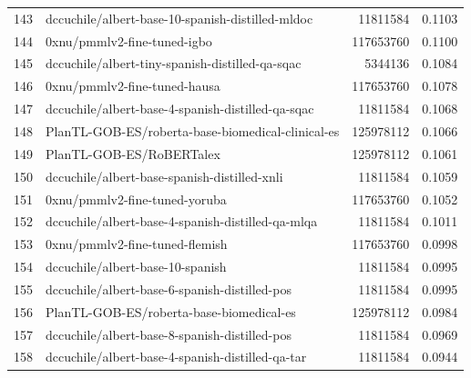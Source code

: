 {\begin{xltabular}{\textwidth}{l X rc}
    143              & dccuchile/albert-base-10-spanish-distilled-mldoc                           & 11811584      & 0.1103       \\
    144              & 0xnu/pmmlv2-fine-tuned-igbo                                                & 117653760     & 0.1100       \\
    145              & dccuchile/albert-tiny-spanish-distilled-qa-sqac                            & 5344136       & 0.1084       \\
    146              & 0xnu/pmmlv2-fine-tuned-hausa                                               & 117653760     & 0.1078       \\
    147              & dccuchile/albert-base-4-spanish-distilled-qa-sqac                          & 11811584      & 0.1068       \\
    148              & PlanTL-GOB-ES/roberta-base-biomedical-clinical-es                          & 125978112     & 0.1066       \\
    149              & PlanTL-GOB-ES/RoBERTalex                                                   & 125978112     & 0.1061       \\
    150              & dccuchile/albert-base-spanish-distilled-xnli                               & 11811584      & 0.1059       \\
    151              & 0xnu/pmmlv2-fine-tuned-yoruba                                              & 117653760     & 0.1052       \\
    152              & dccuchile/albert-base-4-spanish-distilled-qa-mlqa                          & 11811584      & 0.1011       \\
    153              & 0xnu/pmmlv2-fine-tuned-flemish                                             & 117653760     & 0.0998       \\
    154              & dccuchile/albert-base-10-spanish                                           & 11811584      & 0.0995       \\
    155              & dccuchile/albert-base-6-spanish-distilled-pos                              & 11811584      & 0.0995       \\
    156              & PlanTL-GOB-ES/roberta-base-biomedical-es                                   & 125978112     & 0.0984       \\
    157              & dccuchile/albert-base-8-spanish-distilled-pos                              & 11811584      & 0.0969       \\
    158              & dccuchile/albert-base-4-spanish-distilled-qa-tar                           & 11811584      & 0.0944       \\

\end{xltabular}}
